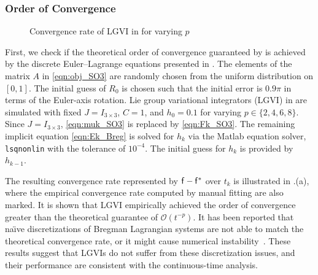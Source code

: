\documentclass[letterpaper, 10pt, conference]{ieeeconf}
\begin{document}
\subsubsection{Order of Convergence}

\begin{figure}
    \centerline{
    }
    \centerline{
    }
    \caption{Convergence rate of LGVI in  for varying $p$}\label{fig:conv}
\end{figure}

First, we check if the theoretical order of convergence guaranteed by  is achieved by the discrete Euler--Lagrange equations presented in .
The elements of the matrix $A$ in \eqref{eqn:obj_SO3} are randomly chosen from the uniform distribution on $[0,1]$.
The initial guess of $R_0$ is chosen such that the initial error is $0.9\pi$ in terms of the Euler-axis rotation. 
Lie group variational integrators (LGVI) in  are simulated with fixed $J=I_{3\times 3}$, $C=1$, and $h_0 = 0.1$ for varying $p\in\{2,4,6,8\}$. 
Since $J=I_{3\times 3}$, \eqref{eqn:muk_SO3} is replaced by \eqref{eqn:Fk_SO3}.
The remaining implicit equation \eqref{eqn:Ek_Breg} is solved for $h_k$ via the Matlab equation solver, \texttt{lsqnonlin} with the tolerance of $10^{-4}$.
The initial guess for $h_k$ is provided by $h_{k-1}$. 

The resulting convergence rate represented by $\mathsf{f}-\mathsf{f}^*$ over $t_k$ is illustrated in .(a), where the empirical convergence rate computed by manual fitting are also marked. 
It is shown that LGVI empirically achieved the order of convergence greater than the theoretical guarantee of $\mathcal{O}(t^{-p})$.
It has been reported that na\"\i ve discretizations of Bregman Lagrangian systems are not able to match the theoretical convergence rate, or it might cause numerical instability~\cite{wibisono2016variational,betancourt2018symplectic}.
These results suggest that LGVIs do not suffer from these discretization issues, and their performance are consistent with the continuous-time analysis. 
\end{document}
